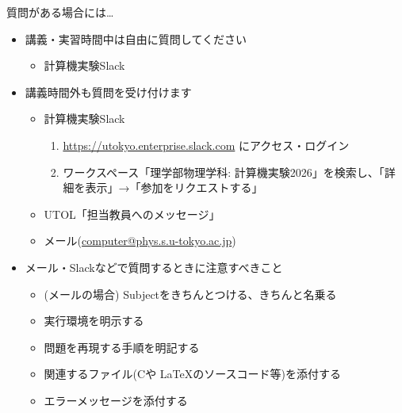 \begin{frame}[t]{質問がある場合には…}
  \begin{itemize}
  \item 講義・実習時間中は自由に質問してください
    \begin{itemize}
    \item 計算機実験Slack
    \end{itemize}
  \item 講義時間外も質問を受け付けます
    \begin{itemize}
    \item 計算機実験Slack
      \begin{enumerate}
        \item \href{https://utokyo.enterprise.slack.com/}{https://utokyo.enterprise.slack.com} にアクセス・ログイン
        \item ワークスペース「理学部物理学科: 計算機実験2026」を検索し、「詳細を表示」→「参加をリクエストする」
      \end{enumerate}
    \item UTOL「担当教員へのメッセージ」
    \item メール(\href{mailto:computer@phys.s.u-tokyo.ac.jp}{computer@phys.s.u-tokyo.ac.jp})
    \end{itemize}
  \item メール・Slackなどで質問するときに注意すべきこと
    \begin{itemize}
    \item (メールの場合) Subjectをきちんとつける、きちんと名乗る
    \item 実行環境を明示する
    \item 問題を再現する手順を明記する
    \item 関連するファイル(Cや \LaTeX のソースコード等)を添付する
    \item エラーメッセージを添付する
    \end{itemize}
  \end{itemize}
\end{frame}
